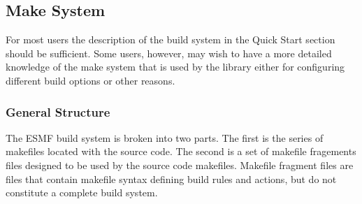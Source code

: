

\subsection{Make System}
For most users the description of the build system in the Quick Start
section should be sufficient.  Some users, however, may wish to have a
more detailed knowledge of the make system that is used by the library
either for configuring different build options or other reasons.
\subsubsection{General Structure}

The ESMF build system is broken into two parts.  The first is the
series of makefiles located with the source code.  The second is a set
of makefile fragements files designed to be used by the source code
makefiles.  Makefile fragment files are files that contain makefile
syntax defining build rules and actions, but do not constitute a
complete build system.

